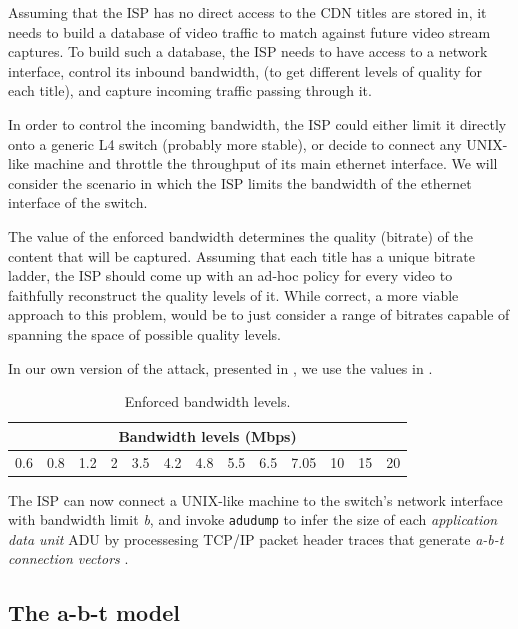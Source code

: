 Assuming that the ISP has no direct access to the CDN titles are stored in, it
needs to build a database of video traffic to match against future video stream
captures. To build such a database, the ISP needs to have access to a network
interface, control its inbound bandwidth, (to get different levels of quality
for each title), and capture incoming traffic passing through it.

In order to control the incoming bandwidth, the ISP could either limit it
directly onto a generic L4 switch (probably more stable), or decide to connect
any UNIX-like machine and throttle the throughput of its main ethernet
interface. We will consider the scenario in which the ISP limits the bandwidth
of the ethernet interface of the switch.

The value of the enforced bandwidth determines the quality (bitrate) of the
content that will be captured. Assuming that each title has a unique bitrate
ladder, the ISP should come up with an ad-hoc policy for every video to
faithfully reconstruct the quality levels of it. While correct, a more viable
approach to this problem, would be to just consider a range of bitrates capable
of spanning the space of possible quality levels. 

In our own version of the attack, presented in , we use
the values in . 

\begin{table}[htb]
  \centering
  \begin{tabular}{|c|c|c|c|c|c|c|c|c|c|c|c|c|}
    \hline
    \multicolumn{13}{|c|}{\textbf{Bandwidth levels (Mbps)}} \\
    \hline
    0.6 & 0.8 & 1.2 & 2 & 3.5 & 4.2 & 4.8 & 5.5 & 6.5 & 7.05 & 10 & 15 & 20 \\ 
    \hline
  \end{tabular}
  \caption{Enforced bandwidth levels.}
  \label{tab:bandwidths}
\end{table}

The ISP can now connect a UNIX-like machine to the switch's network interface
with bandwidth limit \emph{b}, and invoke \texttt{adudump} to infer the size of
each \emph{application data unit} ADU by processesing TCP/IP packet header
traces that generate \emph{a-b-t connection vectors} \cite{hernandez}.

\subsection{The a-b-t model}

